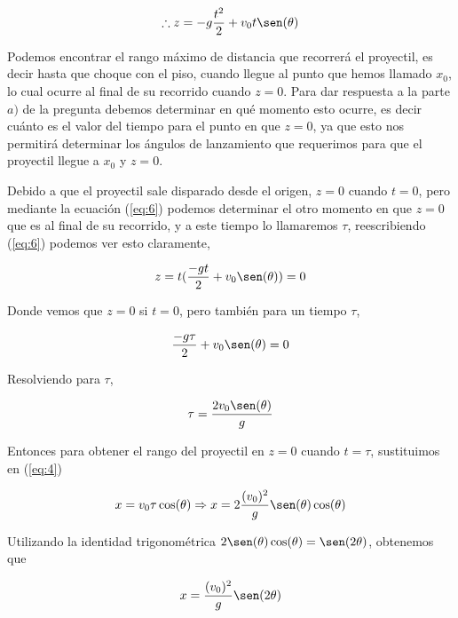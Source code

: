 \documentclass[a4paper,10pt]{article}
\begin{document}
\begin{equation}
 \therefore z = - g \frac{t^2}{2} + v_0 t \sen(\theta)
 \label{eq:6}
\end{equation}

Podemos encontrar el rango máximo de distancia que recorrerá el proyectil, 
es decir hasta que choque con el piso, cuando llegue al punto que hemos llamado
$x_0$, lo cual ocurre al final de su recorrido cuando $z=0$. Para dar
respuesta a la parte $a)$ de la pregunta debemos determinar en qué momento
esto ocurre, es decir cuánto es el valor del tiempo para el punto en que 
$z=0$, ya que esto nos permitirá determinar los ángulos de lanzamiento
que requerimos para que el proyectil llegue a $x_0$ y $z=0$.

\vspace{.3cm}

Debido a que el proyectil sale disparado desde el origen, $z=0$ cuando
$t=0$, pero mediante la ecuación (\ref{eq:6}) podemos determinar el otro
momento en que $z=0$ que es al final de su recorrido, y a este tiempo
lo llamaremos $\tau$, reescribiendo (\ref{eq:6}) podemos ver esto claramente,

\begin{equation*}
 z = t(\frac{-gt}{2} + v_0 \sen(\theta)) = 0
\end{equation*}

Donde vemos que $z=0$ si $t=0$, pero también para un tiempo $\tau$,

\begin{equation*}
 \frac{-g\tau}{2} + v_0 \sen(\theta) = 0
\end{equation*}

Resolviendo para $\tau$,

\begin{equation}
 \tau = \frac{2v_0\sen(\theta)}{g}
 \label{eq:7}
\end{equation}

Entonces para obtener el rango del proyectil en $z=0$ cuando
$t=\tau$, sustituimos en (\ref{eq:4})

\begin{equation*}
 x = v_0 \tau \cos(\theta) \Rightarrow x = 2 \frac{(v_0)^2}{g} \sen(\theta)\cos(\theta)
\end{equation*}

Utilizando la identidad trigonométrica $2\sen(\theta)\cos(\theta) = \sen (2\theta)$,
obtenemos que

\begin{equation}
 x = \frac{(v_0)^2}{g} \sen(2\theta)
 \label{eq:8}
\end{equation}
\end{document}
